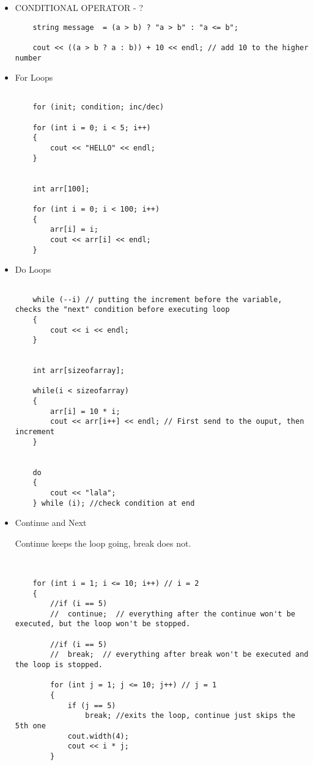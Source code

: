 \documentclass{article}
\begin{document}
\begin{itemize}
\begin{lstlisting}
\end{lstlisting}

\item{CONDITIONAL OPERATOR - ?}
\begin{lstlisting}
	string message  = (a > b) ? "a > b" : "a <= b";

	cout << ((a > b ? a : b)) + 10 << endl; // add 10 to the higher number
\end{lstlisting}


\item{For Loops}
\begin{lstlisting}

	for (init; condition; inc/dec)
	
	for (int i = 0; i < 5; i++)
	{
		cout << "HELLO" << endl;
	}
	
	
	int arr[100];

	for (int i = 0; i < 100; i++)
	{
		arr[i] = i;
		cout << arr[i] << endl;
	}

\end{lstlisting}


\item{Do Loops}
\begin{lstlisting}

	while (--i) // putting the increment before the variable, checks the "next" condition before executing loop
	{
		cout << i << endl;
	}
	
	
	int arr[sizeofarray];
	
	while(i < sizeofarray)
	{
		arr[i] = 10 * i;
		cout << arr[i++] << endl; // First send to the ouput, then increment
	}
	
	
	do
	{
		cout << "lala";
	} while (i); //check condition at end

\end{lstlisting}



\item{Continue and Next}

Continue keeps the loop going, break does not.

\begin{lstlisting}
	
	
	for (int i = 1; i <= 10; i++) // i = 2
	{
		//if (i == 5)
		//	continue;  // everything after the continue won't be executed, but the loop won't be stopped.

		//if (i == 5)
		//	break;  // everything after break won't be executed and the loop is stopped.

		for (int j = 1; j <= 10; j++) // j = 1
		{
			if (j == 5)
				break; //exits the loop, continue just skips the 5th one
			cout.width(4);
			cout << i * j;
		}



\end{lstlisting}
\end{itemize}
\end{document}
